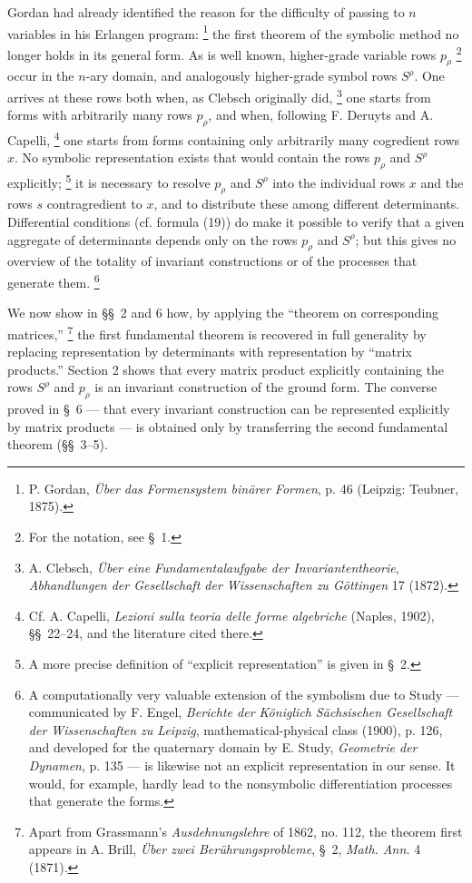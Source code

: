 \documentclass[11pt]{article}
\newcommand{\NoetherSrcNote}[2]{%
  \begingroup
  \renewcommand{\thefootnote}{\ensuremath{[\mathrm{#1}]}}%
  \footnote{#2}%
  \endgroup
}
\begin{document}
Gordan had already identified the reason for the difficulty of passing to $n$ variables in his Erlangen program:\NoetherSrcNote{119:*}{P. Gordan, \emph{\"Uber das Formensystem bin\"arer Formen}, p. 46 (Leipzig: Teubner, 1875).} the first theorem of the symbolic method no longer holds in its general form. As is well known, higher-grade variable rows $p_\rho$\NoetherSrcNote{119:**}{For the notation, see \S\ 1.} occur in the $n$-ary domain, and analogously higher-grade symbol rows $S^\rho$. One arrives at these rows both when, as Clebsch originally did,\NoetherSrcNote{119:***}{A. Clebsch, \emph{\"Uber eine Fundamentalaufgabe der Invariantentheorie}, \emph{Abhandlungen der Gesellschaft der Wissenschaften zu G\"ottingen} 17 (1872).} one starts from forms with arbitrarily many rows $p_\rho$, and when, following F. Deruyts and A. Capelli,\NoetherSrcNote{119:\dagger}{Cf. A. Capelli, \emph{Lezioni sulla teoria delle forme algebriche} (Naples, 1902), \S\S\ 22--24, and the literature cited there.} one starts from forms containing only arbitrarily many cogredient rows $x$. No symbolic representation exists that would contain the rows $p_\rho$ and $S^\rho$ explicitly;\NoetherSrcNote{119:\dagger\dagger}{A more precise definition of ``explicit representation'' is given in \S\ 2.} it is necessary to resolve $p_\rho$ and $S^\rho$ into the individual rows $x$ and the rows $s$ contragredient to $x$, and to distribute these among different determinants. Differential conditions (cf. formula (19)) do make it possible to verify that a given aggregate of determinants depends only on the rows $p_\rho$ and $S^\rho$; but this gives no overview of the totality of invariant constructions or of the processes that generate them.\NoetherSrcNote{119:\dagger\dagger\dagger}{A computationally very valuable extension of the symbolism due to Study --- communicated by F. Engel, \emph{Berichte der K\"oniglich S\"achsischen Gesellschaft der Wissenschaften zu Leipzig}, mathematical-physical class (1900), p. 126, and developed for the quaternary domain by E. Study, \emph{Geometrie der Dynamen}, p. 135 --- is likewise not an explicit representation in our sense. It would, for example, hardly lead to the nonsymbolic differentiation processes that generate the forms.}

We now show in \S\S\ 2 and 6 how, by applying the ``theorem on corresponding matrices,''\NoetherSrcNote{119:*\ensuremath{\dagger}}{Apart from Grassmann's \emph{Ausdehnungslehre} of 1862, no. 112, the theorem first appears in A. Brill, \emph{\"Uber zwei Ber\"uhrungsprobleme}, \S\ 2, \emph{Math. Ann.} 4 (1871).} the first fundamental theorem is recovered in full generality by replacing representation by determinants with representation by ``matrix products.'' Section 2 shows that every matrix product explicitly containing the rows $S^\rho$ and $p_\rho$ is an invariant construction of the ground form. The converse proved in \S\ 6 --- that every invariant construction can be represented explicitly by matrix products --- is obtained only by transferring the second fundamental theorem (\S\S\ 3--5).
\end{document}
